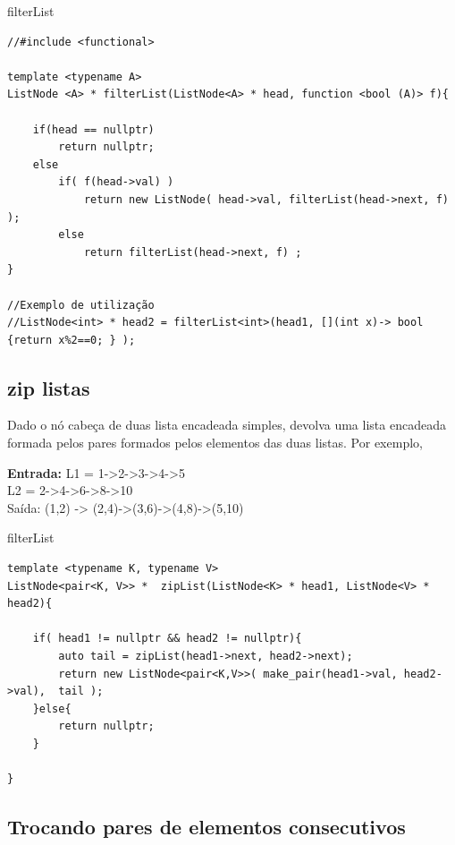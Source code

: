 \begin{listing}[!ht]
\caption{filterList}

\begin{verbatim}
//#include <functional>
 
template <typename A>
ListNode <A> * filterList(ListNode<A> * head, function <bool (A)> f){

    if(head == nullptr)
        return nullptr;
    else
        if( f(head->val) )
            return new ListNode( head->val, filterList(head->next, f) );
        else
            return filterList(head->next, f) ;
}

//Exemplo de utilização
//ListNode<int> * head2 = filterList<int>(head1, [](int x)-> bool {return x%2==0; } );     

\end{verbatim}
\end{listing}

\subsection{zip listas}

Dado o nó cabeça de duas lista encadeada simples, devolva uma lista encadeada formada pelos pares formados pelos elementos das duas listas. Por exemplo,

\textbf{Entrada:}
L1 = 1->2->3->4->5\\
L2 = 2->4->6->8->10\\
Saída:
(1,2) -> (2,4)->(3,6)->(4,8)->(5,10)\\

\begin{listing}[!ht]
\caption{filterList}

\begin{verbatim}
template <typename K, typename V>
ListNode<pair<K, V>> *  zipList(ListNode<K> * head1, ListNode<V> * head2){
    
    if( head1 != nullptr && head2 != nullptr){
        auto tail = zipList(head1->next, head2->next); 
        return new ListNode<pair<K,V>>( make_pair(head1->val, head2->val),  tail );
    }else{
        return nullptr;
    }

}
\end{verbatim}
\end{listing}

\subsection{Trocando pares de elementos consecutivos}

